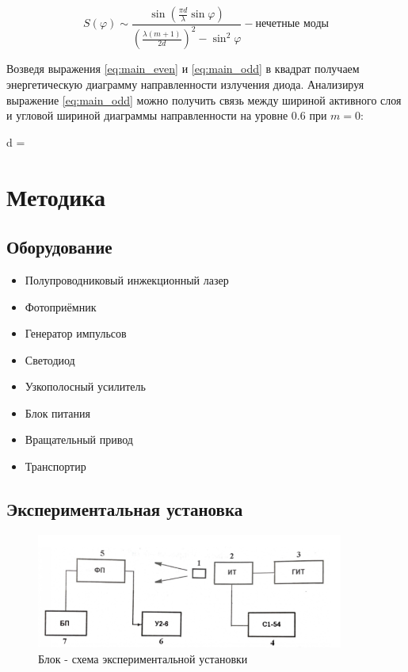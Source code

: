 \documentclass[a4paper, 12pt]{extarticle}
\begin{document}
\begin{equation}
    \label{eq:main_even}
    S(\varphi) \sim \frac{\sin \left( \frac{\pi d}{\lambda} \sin \varphi \right)}
    {\left( \frac{\lambda (m+1)}{2d} \right)^2 - \sin^2 \varphi} - \text{нечетные моды}
\end{equation}


Возведя выражения \ref{eq:main_even} и \ref{eq:main_odd} в квадрат получаем энергетическую диаграмму направленности излучения диода. Анализируя выражение \ref{eq:main_odd} можно получить связь между шириной активного слоя и угловой шириной диаграммы направленности на уровне 0.6 при $m = 0$:

\begin{fequation}
d = 
\end{fequation}


\section*{\textcolor{header}{Методика}}
\subsection*{\textcolor{sub_header}{Оборудование}}
\begin{itemize}
    \item Полупроводниковый инжекционный лазер
    \item Фотоприёмник
    \item Генератор импульсов
    \item Светодиод
    \item Узкополосный усилитель
    \item Блок питания
    \item Вращательный привод
    \item Транспортир
\end{itemize}

\subsection*{\textcolor{sub_header}{Экспериментальная установка}}

\begin{figure}[htbp]
    \centering
    \includegraphics[width = 0.9\textwidth]{pics/experimental_setup.png}
    \caption{Блок - схема экспериментальной установки}
    \label{fig:exp_setup}
\end{figure}
\end{document}

